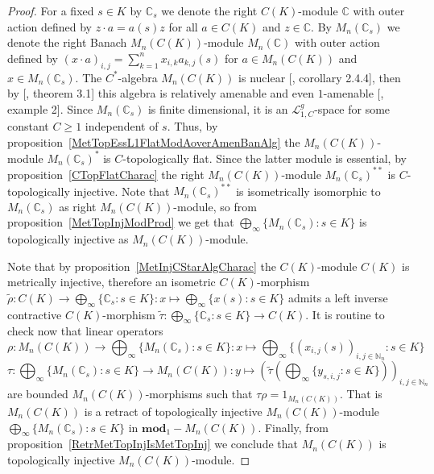 \begin{proof} For a fixed $s\in K$ by $\mathbb{C}_s$ we denote the right
$C(K)$-module $\mathbb{C}$ with outer action defined by $z\cdot a=a(s)z$ for all
$a\in C(K)$ and $z\in\mathbb{C}$. By $M_n(\mathbb{C}_s)$ we denote the right
Banach $M_n(C(K))$-module $M_n(\mathbb{C})$ with outer action defined by
${(x\cdot a)}_{i,j}=\sum_{k=1}^n x_{i,k}a_{k,j}(s)$ for $a\in M_n(C(K))$ and 
$x\in M_n(\mathbb{C}_s)$. The $C^*$-algebra $M_n(C(K))$ is nuclear
[\cite{BroOzaCStarAlgFinDimApprox}, corollary 2.4.4], then by
[\cite{HaaNucCStarAlgAmen}, theorem 3.1] this algebra is relatively amenable and
even $1$-amenable [\cite{RundeAmenConstFour}, example 2]. Since
$M_n(\mathbb{C}_s)$ is finite dimensional, it is an $\mathscr{L}_{1, C}^g$-space
for some constant $C\geq 1$ independent of $s$. Thus, by
proposition~\ref{MetTopEssL1FlatModAoverAmenBanAlg} the $M_n(C(K))$-module
${M_n(\mathbb{C}_s)}^*$ is $C$-topologically flat. Since the latter module is
essential, by proposition~\ref{CTopFlatCharac} the right $M_n(C(K))$-module
${M_n(\mathbb{C}_s)}^{**}$ is $C$-topologically injective. Note that
${M_n(\mathbb{C}_s)}^{**}$ is isometrically isomorphic to $M_n(\mathbb{C}_s)$ as
right $M_n(C(K))$-module, so from proposition~\ref{MetTopInjModProd} we get that
$\bigoplus_\infty \{M_n(\mathbb{C}_s):s\in K \}$ is topologically injective as
$M_n(C(K))$-module.

Note that by proposition~\ref{MetInjCStarAlgCharac} the $C(K)$-module $C(K)$ is
metrically injective, therefore an isometric $C(K)$-morphism
$\widetilde{\rho}
:C(K)\to\bigoplus_\infty \{ \mathbb{C}_s:s\in K \}
:x\mapsto \bigoplus_\infty \{x(s):s\in K \}$ 
admits a left inverse contractive $C(K)$-morphism 
$\widetilde{\tau}:\bigoplus_\infty \{ \mathbb{C}_s:s\in K \} \to C(K)$. 
It is routine to check now that linear operators
$$
\rho
:M_n(C(K))\to\bigoplus\nolimits_\infty \{M_n(\mathbb{C}_s):s\in K \}
:x\mapsto \bigoplus\nolimits_\infty \{
    {(x_{i,j}(s))}_{i,j\in\mathbb{N}_n}:s\in K
 \}
$$
$$
\tau
:\bigoplus\nolimits_\infty \{M_n(\mathbb{C}_s):s\in K \}\to M_n(C(K))
:y\mapsto {\left(
    \widetilde{\tau}\left(\bigoplus\nolimits_\infty \{y_{s,i,j}:s\in K \}\right)
\right)}_{i,j\in\mathbb{N}_n}
$$
are bounded $M_n(C(K))$-morphisms such that $\tau \rho=1_{M_n(C(K))}$. That is
$M_n(C(K))$ is a retract of topologically injective $M_n(C(K))$-module
$\bigoplus_\infty \{M_n(\mathbb{C}_s):s\in K \}$ in $\mathbf{mod}_1-M_n(C(K))$.
Finally, from proposition~\ref{RetrMetTopInjIsMetTopInj} we conclude that
$M_n(C(K))$ is topologically injective $M_n(C(K))$-module.
\end{proof}

